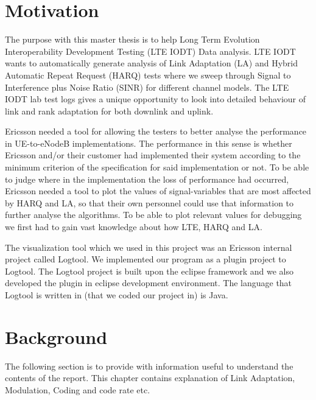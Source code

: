 \documentclass[cropmarks, frame, english]{idamasterthesis}
\begin{document}
\newpage
\section{Motivation}



The purpose with this master thesis is to help Long Term Evolution Interoperability Development Testing (LTE IODT) Data analysis. LTE IODT wants to automatically generate analysis of Link Adaptation (LA) and Hybrid Automatic Repeat Request (HARQ) tests where we sweep through Signal to Interference plus Noise Ratio (SINR) for different channel models. The LTE IODT lab test logs gives a unique opportunity to look into detailed behaviour of link and rank adaptation for both downlink and uplink. \newline


Ericsson needed a tool for allowing the testers to better analyse the performance in UE-to-eNodeB implementations. The performance in this sense is whether Ericsson and/or their customer had implemented their system according to the minimum criterion of the specification for said implementation or not. To be able to judge where in the implementation the loss of performance had occurred, Ericsson needed a tool to plot the values of signal-variables that are most affected by HARQ and LA, so that their own personnel could use that information to further analyse the algorithms. To be able to plot relevant values for debugging we first had to gain vast knowledge about how LTE, HARQ and LA. \newline


The visualization tool which we used in this project was an Ericsson internal project called Logtool. We implemented our program as a plugin project to Logtool. The Logtool project is built upon the eclipse framework and we also developed the plugin in eclipse development environment. The language that Logtool is written in (that we coded our project in) is Java. 
\section{Background}
The following section is to provide with information useful to understand the contents of the report. This chapter contains explanation of Link Adaptation, Modulation, Coding and code rate etc.
\end{document}
